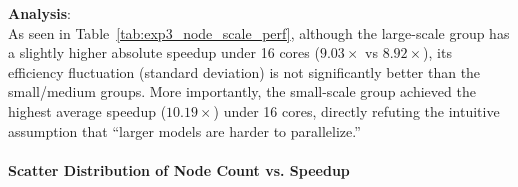 \begin{table}[htbp]
    \centering
    \caption{Average Performance of Models with Different Node Scales on Multi-Core CPUs (No-GIL Valid Data Only)}
    \label{tab:exp3_node_scale_perf}
\end{table}

\textbf{Analysis}: \\
As seen in Table~\ref{tab:exp3_node_scale_perf}, although the large-scale group has a slightly higher absolute speedup under 16 cores ($9.03\times$ vs $8.92\times$), its efficiency fluctuation (standard deviation) is not significantly better than the small/medium groups. More importantly, the small-scale group achieved the highest average speedup ($10.19\times$) under 16 cores, directly refuting the intuitive assumption that ``larger models are harder to parallelize.''

\paragraph{Scatter Distribution of Node Count vs. Speedup}

